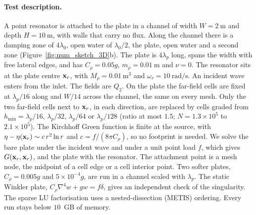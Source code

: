 {\paragraph{Test description.} A point resonator is attached to the plate in a channel of width $W=2~\si{\meter}$ and depth $H=10~\si{\meter}$, with walls that carry no flux. Along the channel there is a damping zone of $4\lambda_0$, open water of $\lambda_0/2$, the plate, open water and a second zone (Figure~\ref{fig:num_sketch_3D}b). The plate is $4\lambda_p$ long, spans the width with free lateral edges, and has $C_\rho=0.05g$, $m_\rho=0.01~\si{\meter}$ and $\nu=0$. The resonator sits at the plate centre $\mathbf{x}_r$, with $M_\rho=0.01~\si{\meter\cubed}$ and $\omega_r=10~\si{\radian\per\second}$. An incident wave enters from the inlet. The fields are $Q_2$. On the plate the far-field cells are fixed at $\lambda_p/16$ along and $W/14$ across the channel, the same on every mesh. Only the two far-field cells next to $\mathbf{x}_r$, in each direction, are replaced by cells graded from $h_\mathrm{min}=\lambda_p/16$, $\lambda_p/32$, $\lambda_p/64$ or $\lambda_p/128$ (ratio at most $1.5$; $N=1.3\times10^5$ to $2.1\times10^5$). The Kirchhoff Green function is finite at the source, with $\eta-\eta(\mathbf{x}_r)\sim c\,r^2\ln r$ and $c=f/(8\pi C_\rho)$, so no footprint is needed. We solve the bare plate under the incident wave and under a unit point load $f$, which gives $G(\mathbf{x}_r,\mathbf{x}_r)$, and the plate with the resonator. The attachment point is a mesh node, the midpoint of a cell edge or a cell interior point. Two softer plates, $C_\rho=0.005g$ and $5\times10^{-4}g$, are run in a channel scaled with $\lambda_p$. The static Winkler plate, $C_\rho\nabla^4w+gw=f\delta$, gives an independent check of the singularity. The sparse LU factorisation uses a nested-dissection (METIS) ordering. Every run stays below $10$~GB of memory.

}

